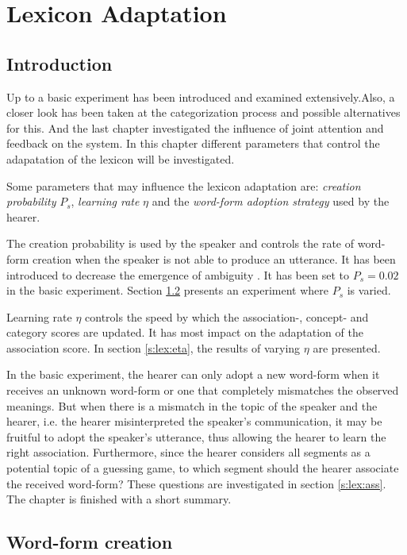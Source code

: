 \chapter{Lexicon Adaptation}\label{ch:lex}

\section{Introduction}

Up to a basic experiment has been introduced and examined extensively.Also, a closer look has been taken at the categorization process and possible alternatives for this. And the last chapter investigated the influence of joint attention and feedback on the system. In this chapter different parameters that control the adapatation of the lexicon will be investigated.

\p{}
Some parameters that may influence the lexicon adaptation are: {\em creation probability} $P_s$, {\em learning rate} $\eta$ and the {\em word-form adoption strategy} used by the hearer.

The creation probability is used by the speaker and controls the rate of word-form creation when the speaker is not able to produce an utterance. It has been introduced to decrease the emergence of ambiguity \cite{steels:1996a}. It has been set to $P_s=0.02$ in the basic experiment. Section \ref{s:lex:Ps} presents an experiment where $P_s$ is varied.

Learning rate $\eta$ controls the speed by which the association-, concept- and category scores are updated. It has most impact on the adaptation of the association score. In section \ref{s:lex:eta}, the results of varying $\eta$ are presented.

In the basic experiment, the hearer can only adopt a new word-form when it receives an unknown word-form or one that completely mismatches the observed meanings. But when there is a mismatch in the topic of the speaker and the hearer, i.e. the hearer misinterpreted the speaker's communication, it may be fruitful to adopt the speaker's utterance, thus allowing the hearer to learn the right association. Furthermore, since the hearer considers all segments as a potential topic of a guessing game, to which segment should the hearer associate the received word-form? These questions are investigated in section \ref{s:lex:ass}. The chapter is finished with a short summary.


\section{Word-form creation}\label{s:lex:Ps}

